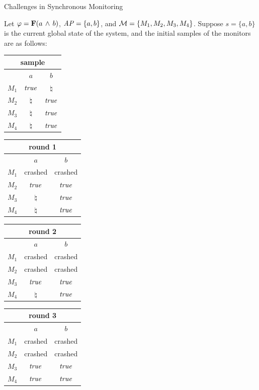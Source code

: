 \begin{frame}{Challenges in Synchronous Monitoring}


\begin{example}
Let $\varphi = \mathbf{F} (a \, \wedge \, b)$, $\mathit{AP}=\{a, b\}$, and $\mathcal{M} =\{M_1, 
M_2, M_3, M_4\}$. Suppose $s=\{a,b\}$ is the current global state of the 
system, and the initial samples of the monitors are as follows:\\


\begin{center}

\begin{tabular}{| c |c |c|}

\multicolumn{3}{c}{sample} \\
\hline
&$a$&$b$\\
\hline
$M_1$ & $\mathit{true}$  & $\natural$\\
$M_2$ & $\natural$ & $\mathit{true}$\\
$M_3$ & $\natural$ & $\mathit{true}$ \\
$M_4$ & $\natural$ & $\mathit{true}$ \\
\hline
\end{tabular}
\quad
\begin{tabular}{| c |c |c|}
\multicolumn{3}{c}{round 1} \\
\hline
&$a$&$b$\\
\hline
$M_1$ & crashed & crashed\\
$M_2$ & $\mathit{true}$ & $\mathit{true}$\\
$M_3$ & $\natural$ & $\mathit{true}$ \\
$M_4$ & $\natural$ & $\mathit{true}$ \\
\hline
\end{tabular}


\end{center}


\begin{center}
\begin{tabular}{|c |c |c|}
\multicolumn{3}{c}{round 2} \\
\hline
&$a$&$b$\\
\hline
$M_1$ & crashed & crashed\\
$M_2$ & crashed & crashed\\
$M_3$ & $\mathit{true}$ & $\mathit{true}$ \\
$M_4$ & $\natural$ & $\mathit{true}$ \\
\hline
\end{tabular}
\quad
\begin{tabular}{| c |c |c|}
\multicolumn{3}{c}{round 3} \\
\hline
&$a$&$b$\\
\hline
$M_1$ & crashed & crashed\\
$M_2$ & crashed & crashed\\
$M_3$ & $\mathit{true}$ & $\mathit{true}$  \\
$M_4$ & $\mathit{true}$ & $\mathit{true}$  \\
\hline
\end{tabular}   


\end{center}
\end{example}
\end{frame}
